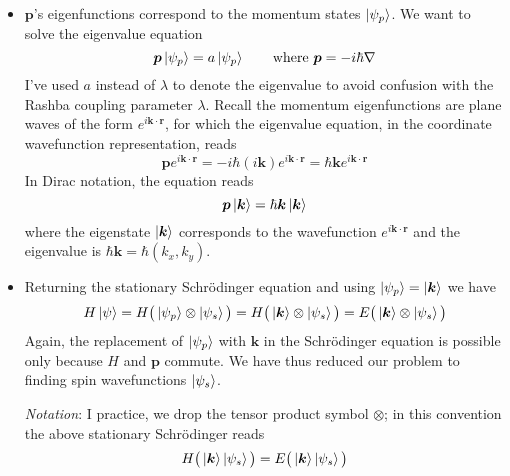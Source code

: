 \documentclass[11pt, a4paper]{article}
\newcommand{\schro}{Schr\"{o}dinger\xspace}
\renewcommand{\vec}[1]{\bm{#1}} %
\renewcommand{\k}{\vec{k}}  %
\begin{document}
\begin{itemize}
	\item $ \vec{p} $'s eigenfunctions correspond to the momentum states $ \ket{\psi_{p}} $. We want to solve the eigenvalue equation
	\begin{equation*}
		\vec{p}\ket{\psi_{p}} = a \ket{\psi_{p}} \qquad \text{where } \vec{p} = -i\hbar \nabla
	\end{equation*}
	I've used $ a $ instead of $ \lambda $ to denote the eigenvalue to avoid confusion with the Rashba coupling parameter $ \lambda $. Recall the momentum eigenfunctions are plane waves of the form $ e^{i\vec{k}\cdot \vec{r}} $, for which the eigenvalue equation, in the coordinate wavefunction representation, reads
	\begin{equation*}
		\vec{p} e^{i\vec{k}\cdot \vec{r}} = -i\hbar (i \vec{k}) e^{i\vec{k}\cdot \vec{r}} = \hbar \vec{k}e^{i\vec{k}\cdot \vec{r}}
	\end{equation*}
	In Dirac notation, the equation reads
	\begin{equation*}
		\vec{p}\ket{\vec{k}} = \hbar \vec{k} \ket{\vec{k}} 
	\end{equation*}
	where the eigenstate $ \ket{\k} $ corresponds to the wavefunction $ e^{i\vec{k}\cdot \vec{r}} $ and the eigenvalue is $ \hbar \vec{k} = \hbar(k_{x}, k_{y}) $.
	
	\item Returning the stationary \schro equation and using $ \ket{\psi_{p}} = \ket{\k} $ we have
	\begin{equation*}
		H\ket{\psi} = H\big(\ket{\psi_{p}} \otimes \ket{\psi_{s}}\big) = H\big(\ket{\k} \otimes \ket{\psi_{s}}\big) = E \big(\ket{\k}\otimes \ket{\psi_{s}}\big)
	\end{equation*}
	Again, the replacement of $ \ket{\psi_{p}}$ with $ \k $ in the \schro equation is possible only because $ H $ and $ \vec{p} $ commute. We have thus reduced our problem to finding spin wavefunctions $ \ket{\psi_{s}} $. 
	
	\textit{Notation}: I practice, we drop the tensor product symbol $ \otimes $; in this convention the above stationary \schro reads
	\begin{equation*}
		H\big(\ket{\k} \ket{\psi_{s}}\big) = E \big(\ket{\k} \ket{\psi_{s}}\big)
	\end{equation*}
	

\end{itemize}
\end{document}
